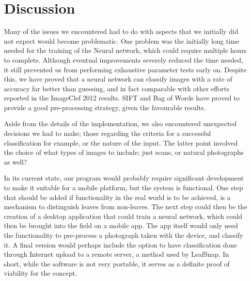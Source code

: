 \section{Discussion}
Many of the issues we encountered had to do with aspects that we initially did not expect would become problematic. One problem was the initially long time needed for the training of the Neural network, which could require multiple hours to complete. Although eventual improvements severely reduced the time needed, it still prevented us from performing exhaustive parameter tests early on. Despite this, we have proved that a neural network can classify images with a rate of accuracy far better than guessing, and in fact comparable with other efforts reported in the ImageClef 2012 results. SIFT and Bag of Words have proved to provide a good pre-processing strategy, given the favourable results.

Aside from the details of the implementation, we also encountered unexpected decisions we had to make; those regarding the criteria for a successful classification for example, or the nature of the input. The latter point involved the choice of what types of images to include; just scans, or natural photographs as well?

In its current state, our program would probably require significant development to make it suitable for a mobile platform, but the system is functional. One step that should be added if functionality in the real world is to be achieved, is a mechanism to distinguish leaves from non-leaves. The next step could then be the creation of a desktop application that could train a neural network, which could then be brought into the field on a mobile app. The app itself would only need the functionality to pre-process a photograph taken with the device, and classify it. A final version would perhaps include the option to have classification done through Internet upload to a remote server, a method used by LeafSnap. In short, while the software is not very portable, it serves as a definite proof of viability for the concept.



%
%
%
%
